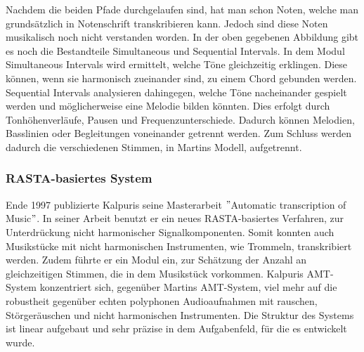 Nachdem die beiden Pfade durchgelaufen sind, hat man schon Noten,
welche man grundsätzlich in Notenschrift transkribieren kann.
Jedoch sind diese Noten musikalisch noch nicht verstanden worden.
In der oben gegebenen Abbildung gibt es noch die Bestandteile Simultaneous und Sequential Intervals.
In dem Modul Simultaneous Intervals wird ermittelt, welche Töne gleichzeitig erklingen.
Diese können, wenn sie harmonisch zueinander sind, zu einem Chord gebunden werden.
Sequential Intervals analysieren dahingegen, welche Töne nacheinander gespielt werden und
möglicherweise eine Melodie bilden könnten.
Dies erfolgt durch Tonhöhenverläufe, Pausen und Frequenzunterschiede.
Dadurch können Melodien, Basslinien oder Begleitungen voneinander getrennt werden.
Zum Schluss werden dadurch die verschiedenen Stimmen, in Martins Modell, aufgetrennt.

\subsubsection{RASTA-basiertes System}
Ende 1997 publizierte Kalpuris seine Masterarbeit \("\)Automatic transcription of Music\("\).
\cite{klapuri1998automatic}
In seiner Arbeit benutzt er ein neues RASTA-basiertes Verfahren, zur Unterdrückung nicht harmonischer Signalkomponenten.
Somit konnten auch Musikstücke mit nicht harmonischen Instrumenten, wie Trommeln, transkribiert werden.
Zudem führte er ein Modul ein, zur Schätzung der Anzahl an gleichzeitigen Stimmen, die in dem Musikstück vorkommen.
Kalpuris AMT-System konzentriert sich, gegenüber Martins AMT-System, viel mehr auf die robustheit gegenüber
echten polyphonen Audioaufnahmen mit rauschen, Störgeräuschen und nicht harmonischen Instrumenten.
Die Struktur des Systems ist linear aufgebaut und sehr präzise in dem Aufgabenfeld, für die es entwickelt wurde.

\begin{center}
    \vspace{1em}
    \vspace{1em}
\end{center}

